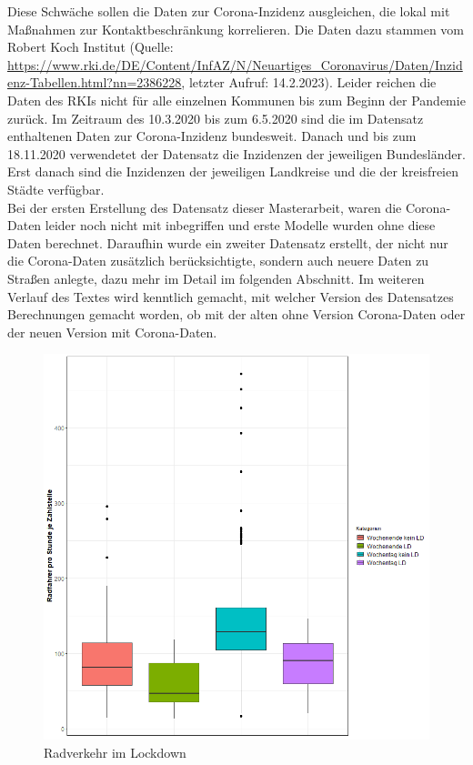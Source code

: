 \documentclass[a4paper,12pt]{thesis}
\begin{document}
Diese Schwäche sollen die Daten zur Corona-Inzidenz ausgleichen, die lokal mit Maßnahmen zur Kontaktbeschränkung korrelieren. Die Daten dazu stammen vom Robert Koch Institut (Quelle: \url{https://www.rki.de/DE/Content/InfAZ/N/Neuartiges_Coronavirus/Daten/Inzidenz-Tabellen.html?nn=2386228}, letzter Aufruf: 14.2.2023). Leider reichen die Daten des RKIs nicht für alle einzelnen Kommunen bis zum Beginn der Pandemie zurück. Im Zeitraum des 10.3.2020 bis zum 6.5.2020 sind die im Datensatz enthaltenen Daten zur Corona-Inzidenz bundesweit. Danach und bis zum 18.11.2020 verwendetet der Datensatz die Inzidenzen der jeweiligen Bundesländer. Erst danach sind die Inzidenzen der jeweiligen Landkreise und die der kreisfreien Städte verfügbar.\\
Bei der ersten Erstellung des Datensatz dieser Masterarbeit, waren die Corona-Daten leider noch nicht mit inbegriffen und erste Modelle wurden ohne diese Daten berechnet. Daraufhin wurde ein zweiter Datensatz erstellt, der nicht nur die Corona-Daten zusätzlich berücksichtigte, sondern auch neuere Daten zu Straßen anlegte, dazu mehr im Detail im folgenden Abschnitt. Im weiteren Verlauf des Textes wird kenntlich gemacht, mit welcher Version des Datensatzes Berechnungen gemacht worden, ob mit der alten ohne Version Corona-Daten oder der neuen Version mit Corona-Daten.\\

\begin{figure}[!ht]
	\centering
	\includegraphics[width=\textwidth]{Plots/plot63.png}
	\caption{Radverkehr im Lockdown}
	\label{CoronaandBiking}
\end{figure}
\end{document}
